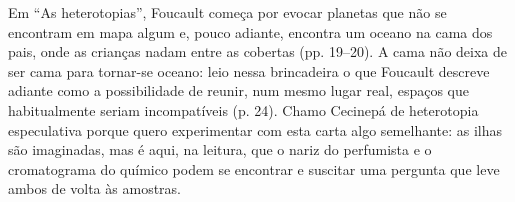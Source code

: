 Em \enquote{As heterotopias}, Foucault começa por evocar planetas que não se encontram em mapa algum e, pouco adiante, encontra um oceano na cama dos pais, onde as crianças nadam entre as cobertas (pp. 19–20). A cama não deixa de ser cama para tornar-se oceano: leio nessa brincadeira o que Foucault descreve adiante como a possibilidade de reunir, num mesmo lugar real, espaços que habitualmente seriam incompatíveis (p. 24). Chamo Cecinepá de heterotopia especulativa porque quero experimentar com esta carta algo semelhante: as ilhas são imaginadas, mas é aqui, na leitura, que o nariz do perfumista e o cromatograma do químico podem se encontrar e suscitar uma pergunta que leve ambos de volta às amostras.